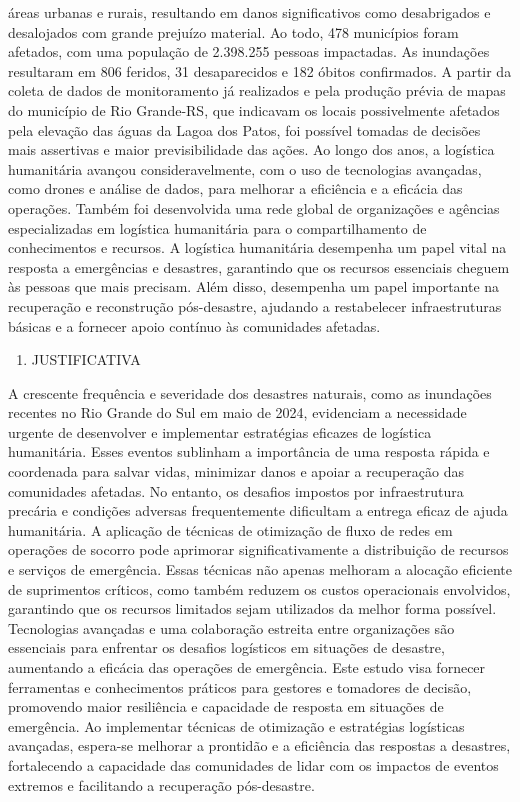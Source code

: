 \documentclass[
]{article}
\providecommand{\tightlist}{%
  \setlength{\itemsep}{0pt}\setlength{\parskip}{0pt}}
\begin{document}
áreas urbanas e rurais, resultando em danos significativos como
desabrigados e desalojados com grande prejuízo material. Ao todo, 478
municípios foram afetados, com uma população de 2.398.255 pessoas
impactadas. As inundações resultaram em 806 feridos, 31 desaparecidos e
182 óbitos confirmados. A partir da coleta de dados de monitoramento já
realizados e pela produção prévia de mapas do município de Rio
Grande-RS, que indicavam os locais possivelmente afetados pela elevação
das águas da Lagoa dos Patos, foi possível tomadas de decisões mais
assertivas e maior previsibilidade das ações. Ao longo dos anos, a
logística humanitária avançou consideravelmente, com o uso de
tecnologias avançadas, como drones e análise de dados, para melhorar a
eficiência e a eficácia das operações. Também foi desenvolvida uma rede
global de organizações e agências especializadas em logística
humanitária para o compartilhamento de conhecimentos e recursos. A
logística humanitária desempenha um papel vital na resposta a
emergências e desastres, garantindo que os recursos essenciais cheguem
às pessoas que mais precisam. Além disso, desempenha um papel importante
na recuperação e reconstrução pós-desastre, ajudando a restabelecer
infraestruturas básicas e a fornecer apoio contínuo às comunidades
afetadas.

\begin{enumerate}
\def\labelenumi{\arabic{enumi}.}
\setcounter{enumi}{1}
\tightlist
\item
  JUSTIFICATIVA
\end{enumerate}

A crescente frequência e severidade dos desastres naturais, como as
inundações recentes no Rio Grande do Sul em maio de 2024, evidenciam a
necessidade urgente de desenvolver e implementar estratégias eficazes de
logística humanitária. Esses eventos sublinham a importância de uma
resposta rápida e coordenada para salvar vidas, minimizar danos e apoiar
a recuperação das comunidades afetadas. No entanto, os desafios impostos
por infraestrutura precária e condições adversas frequentemente
dificultam a entrega eficaz de ajuda humanitária. A aplicação de
técnicas de otimização de fluxo de redes em operações de socorro pode
aprimorar significativamente a distribuição de recursos e serviços de
emergência. Essas técnicas não apenas melhoram a alocação eficiente de
suprimentos críticos, como também reduzem os custos operacionais
envolvidos, garantindo que os recursos limitados sejam utilizados da
melhor forma possível. Tecnologias avançadas e uma colaboração estreita
entre organizações são essenciais para enfrentar os desafios logísticos
em situações de desastre, aumentando a eficácia das operações de
emergência. Este estudo visa fornecer ferramentas e conhecimentos
práticos para gestores e tomadores de decisão, promovendo maior
resiliência e capacidade de resposta em situações de emergência. Ao
implementar técnicas de otimização e estratégias logísticas avançadas,
espera-se melhorar a prontidão e a eficiência das respostas a desastres,
fortalecendo a capacidade das comunidades de lidar com os impactos de
eventos extremos e facilitando a recuperação pós-desastre.
\end{document}

